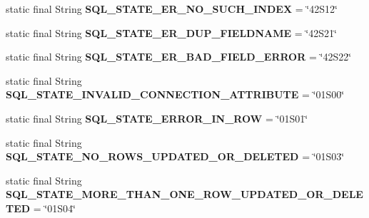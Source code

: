 \begin{DoxyCompactItemize}
\mbox{\label{classcom_1_1mysql_1_1jdbc_1_1_s_q_l_error_a71c0f22ada4a9f6f4383a71c7b9cbf20}} 
static final String {\bfseries S\+Q\+L\+\_\+\+S\+T\+A\+T\+E\+\_\+\+E\+R\+\_\+\+N\+O\+\_\+\+S\+U\+C\+H\+\_\+\+I\+N\+D\+EX} = \char`\"{}42\+S12\char`\"{}
\item 
\mbox{\label{classcom_1_1mysql_1_1jdbc_1_1_s_q_l_error_a2ab70bd1cea411f52542729d75fc9aa7}} 
static final String {\bfseries S\+Q\+L\+\_\+\+S\+T\+A\+T\+E\+\_\+\+E\+R\+\_\+\+D\+U\+P\+\_\+\+F\+I\+E\+L\+D\+N\+A\+ME} = \char`\"{}42\+S21\char`\"{}
\item 
\mbox{\label{classcom_1_1mysql_1_1jdbc_1_1_s_q_l_error_a3b50c2ec0342e78ab91401a392e29895}} 
static final String {\bfseries S\+Q\+L\+\_\+\+S\+T\+A\+T\+E\+\_\+\+E\+R\+\_\+\+B\+A\+D\+\_\+\+F\+I\+E\+L\+D\+\_\+\+E\+R\+R\+OR} = \char`\"{}42\+S22\char`\"{}
\item 
\mbox{\label{classcom_1_1mysql_1_1jdbc_1_1_s_q_l_error_af487bd922823f08b3750dbdea4c83033}} 
static final String {\bfseries S\+Q\+L\+\_\+\+S\+T\+A\+T\+E\+\_\+\+I\+N\+V\+A\+L\+I\+D\+\_\+\+C\+O\+N\+N\+E\+C\+T\+I\+O\+N\+\_\+\+A\+T\+T\+R\+I\+B\+U\+TE} = \char`\"{}01\+S00\char`\"{}
\item 
\mbox{\label{classcom_1_1mysql_1_1jdbc_1_1_s_q_l_error_a5ac12f5d6d9613ac437ae832ecb2f3b9}} 
static final String {\bfseries S\+Q\+L\+\_\+\+S\+T\+A\+T\+E\+\_\+\+E\+R\+R\+O\+R\+\_\+\+I\+N\+\_\+\+R\+OW} = \char`\"{}01\+S01\char`\"{}
\item 
\mbox{\label{classcom_1_1mysql_1_1jdbc_1_1_s_q_l_error_a65dbb8c8e1d57d988e61ab681944f87f}} 
static final String {\bfseries S\+Q\+L\+\_\+\+S\+T\+A\+T\+E\+\_\+\+N\+O\+\_\+\+R\+O\+W\+S\+\_\+\+U\+P\+D\+A\+T\+E\+D\+\_\+\+O\+R\+\_\+\+D\+E\+L\+E\+T\+ED} = \char`\"{}01\+S03\char`\"{}
\item 
\mbox{\label{classcom_1_1mysql_1_1jdbc_1_1_s_q_l_error_afeb07040c0b9f66257b046719fe97570}} 
static final String {\bfseries S\+Q\+L\+\_\+\+S\+T\+A\+T\+E\+\_\+\+M\+O\+R\+E\+\_\+\+T\+H\+A\+N\+\_\+\+O\+N\+E\+\_\+\+R\+O\+W\+\_\+\+U\+P\+D\+A\+T\+E\+D\+\_\+\+O\+R\+\_\+\+D\+E\+L\+E\+T\+ED} = \char`\"{}01\+S04\char`\"{}

\end{DoxyCompactItemize}
